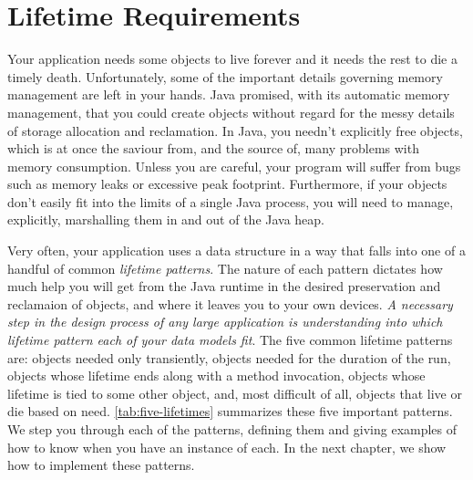 \chapter{Lifetime Requirements}

Your application needs some objects to live forever and it needs the rest to die
a timely death. Unfortunately, some of the important details governing memory
management are left in your hands. Java promised, with its automatic memory
management, that you could create objects without regard for the messy details of
storage allocation and reclamation. In Java, you needn't explicitly free objects,
which is at once the saviour from, and the source of, many problems with memory
consumption. Unless you are careful, your program will suffer from bugs such as
memory leaks or excessive peak footprint. Furthermore, if
your objects don't easily fit into the limits of a single Java process, you will
need to manage, explicitly, marshalling them in and out of the Java
heap.

Very often, your application uses a data structure in a way that falls into one
of a handful of common \emph{lifetime patterns}. The
nature of each pattern dictates how much help you will get from the Java runtime
in the desired preservation and reclamaion of objects, and where it leaves you to
your own devices. \emph{A necessary step in the design process of any large
application is understanding into which lifetime pattern each of your data models
fit}. The five common lifetime patterns are: objects needed only transiently,
objects needed for the duration of the run, objects whose lifetime ends along
with a method invocation, objects whose lifetime is tied to some other object,
and, most difficult of all, objects that live or die based on need.
\autoref{tab:five-lifetimes} summarizes these five important patterns. We step
you through each of the patterns, defining them and giving examples of how to
know when you have an instance of each. In the next chapter, we show how to
implement these patterns.


